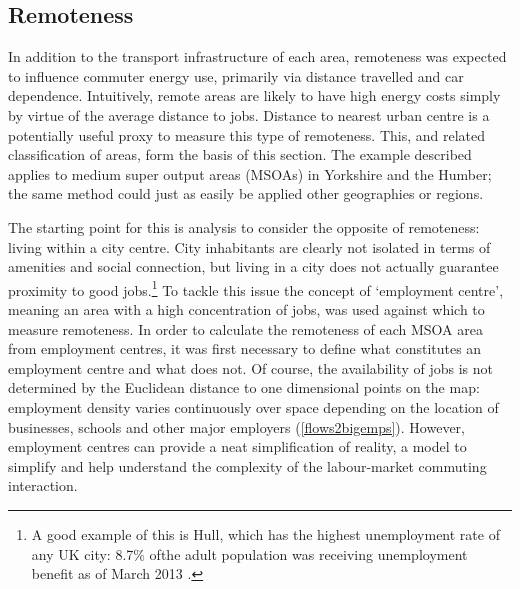 \documentclass[a4paper, 11pt, twoside]{Thesis}
\begin{document}
\subsection{Remoteness}  \label{sremotness}
In addition to the transport infrastructure of each area, remoteness was
expected to influence
commuter energy use, primarily via distance travelled and car dependence.
Intuitively, remote areas are likely to have high energy costs simply by virtue
of the average distance to jobs. Distance to nearest urban centre is a
potentially useful proxy to measure this type of remoteness. This, and
related classification of areas, form the basis of this section.  
The example described applies to medium super output areas (MSOAs) in Yorkshire
and the Humber; the same method could just as easily be applied other
geographies or regions.

The starting point for this is analysis to consider the opposite of remoteness:
living within a city centre. City inhabitants are clearly not isolated in terms
of amenities and social connection, but living in a city does not
actually guarantee proximity to good jobs.\footnote{A good
example of this is Hull, which has the highest unemployment rate of any UK city:
8.7\% ofthe adult population was receiving unemployment benefit as of March 2013
\citep{SimonRog}.
}
To tackle this issue the concept of `employment centre', meaning an area 
with a high concentration of jobs,  was used
against which to measure remoteness. In order to calculate the remoteness of
each MSOA area from employment centres,
it was first necessary to define what constitutes an employment centre and what
does not. Of course, the availability of jobs is not determined by the
Euclidean distance to one dimensional points on the map: employment density
varies continuously over space depending on the location of businesses, schools
and other major employers (\cref{flows2bigemps}). However, employment centres
can provide a neat simplification of reality, a model to simplify and help
understand the complexity of the labour-market commuting interaction.
\end{document}
